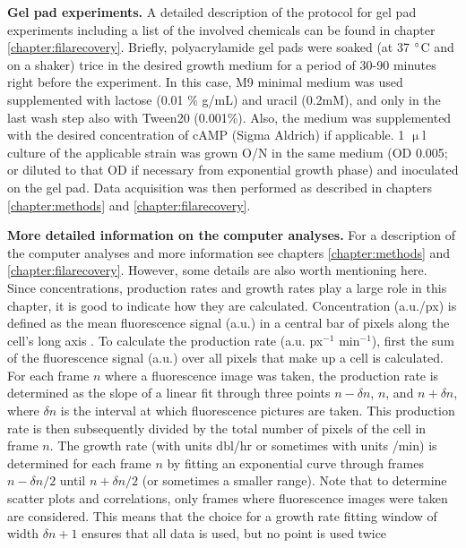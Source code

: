 \textbf{Gel pad experiments.} A detailed description of the protocol for gel pad experiments including a list of the involved chemicals can be found in chapter \ref{chapter:filarecovery}. Briefly, polyacrylamide gel pads were soaked (at 37 $\degree$C and on a shaker) trice in the desired growth medium for a period of 30-90 minutes right before the experiment. In this case, M9 minimal medium was used supplemented with lactose (0.01 \% g/mL) and uracil (0.2mM), and only in the last wash step also with Tween20 (0.001\%).
Also, the medium was supplemented with the desired concentration of cAMP (Sigma Aldrich) if applicable.
1 $\upmu$l culture of the applicable strain was grown O/N in the same medium (OD 0.005; or diluted to that OD if necessary from exponential growth phase) and inoculated on the gel pad. Data acquisition was then performed as described in chapters \ref{chapter:methods} and \ref{chapter:filarecovery}.

\textbf{More detailed information on the computer analyses.} 
For a description of the computer analyses and more information see chapters \ref{chapter:methods} and \ref{chapter:filarecovery}.
However, some details are also worth mentioning here. 
Since concentrations, production rates and growth rates play a large role in this chapter, it is good to indicate how they are calculated.
Concentration (a.u./px) is defined as the mean fluorescence signal (a.u.) in a central bar of pixels along the cell's long axis \cite{Kiviet2010}.
%
To calculate the production rate (a.u. px$^{-1}$ min$^{-1}$), first the sum of the fluorescence signal (a.u.) over all pixels that make up a cell is calculated. 
For each frame $n$ where a fluorescence image was taken, the production rate is determined as the slope of a linear fit through three points $n-\delta{n}$, $n$, and $n+\delta{n}$, where $\delta{n}$ is the interval at which fluorescence pictures are taken. This production rate is then subsequently divided by the total number of pixels of the cell in frame $n$.
The growth rate (with units dbl/hr or sometimes with units /min) is determined for each frame $n$ by fitting an exponential curve through frames $n-\delta{n}/2$ until $n+\delta{n}/2$ (or sometimes a smaller range).
Note that to determine scatter plots and correlations, only frames where fluorescence images were taken are considered.
This means that the choice for a growth rate fitting window of width $\delta{n}+1$ ensures that all data is used, but no point is used twice


